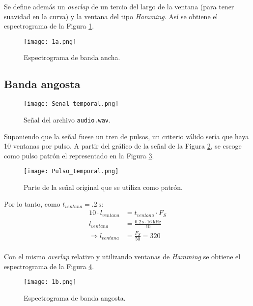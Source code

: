 		Se define además un \textit{overlap} de un tercio del largo de la ventana (para tener suavidad en la curva) y la ventana del tipo \textit{Hamming}. Así se obtiene el espectrograma de la Figura \ref{graf:banda_ancha}.

	\begin{figure}
		\centering
		\texttt{[image: 1a.png]}
		\caption{Espectrograma de banda ancha.}
		\label{graf:banda_ancha}
	\end{figure}

	\subsection{Banda angosta}
	
		\begin{figure}[h!]
			\centering
			\texttt{[image: Senal\_temporal.png]}
			\caption{Señal del archivo \texttt{audio.wav}.}
			\label{graf:senal_original}
		\end{figure}


		Suponiendo que la señal fuese un tren de pulsos, un criterio válido sería que haya 10 ventanas por pulso. A partir del gráfico de la señal de la Figura \ref{graf:senal_original}, se escoge como pulso patrón el representado en la Figura \ref{graf:pulso_patron}.

		\begin{figure}[h!]
			\centering
			\texttt{[image: Pulso\_temporal.png]}
			\caption{Parte de la señal original que se utiliza como patrón.}
			\label{graf:pulso_patron}
		\end{figure}

		Por lo tanto, como $t_{ventana}=\SI{.2}{\s}$:
			\begin{align*}
				10\cdot l_{ventana} &= t_{ventana} \cdot F_S\\
				l_{ventana} &= \frac{\SI{0.2}{\s} \cdot \SI{16}{\kHz}}{10}\\
				\Rightarrow l_{ventana} &= \frac{F_S}{50} = 320\\
			\end{align*}

		Con el mismo \textit{overlap} relativo y utilizando ventanas de \textit{Hamming} se obtiene el espectrograma de la Figura \ref{graf:banda_angosta}.

		\begin{figure}[h!]
			\centering
			\texttt{[image: 1b.png]}
			\caption{Espectrograma de banda angosta.}
			\label{graf:banda_angosta}
		\end{figure}
